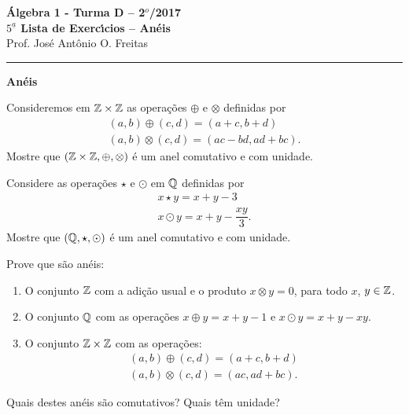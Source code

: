 \documentclass[12pt]{article}
\begin{document}


\begin{center}
 {\Large\bf {\'A}lgebra 1 - Turma D -- 2$^{o}$/2017} \\
 \vspace{9pt} {\large\bf $5^{\underline{a}}$ Lista de Exerc{\'\i}cios -- An\'eis}\\
 \vspace{9pt} Prof. Jos{\'e} Ant{\^o}nio O. Freitas
\end{center}
\hrule


\begin{center}
\Large{\bf An{\'e}is}
\end{center}

\vspace{.6cm}

\questao Consideremos em $\mathbb{Z} \times \mathbb{Z}$ as opera\c{c}\~oes $\oplus$ e $\otimes$ definidas por
\begin{align*}
	(a, b) \oplus (c, d) = (a + c, b + d)\\
	(a ,b) \otimes (c, d) = (ac - bd, ad + bc).
\end{align*}
Mostre que $(\mathbb{Z} \times \mathbb{Z}, \oplus, \otimes)$ \'e um anel comutativo e com unidade.

\vesp

\questao Considere as opera\c{c}\~oes $\star$ e $\odot$ em $\mathbb{Q}$ definidas por
\begin{align*}
	x \star y = x + y - 3\\
	x \odot y = x + y - \dfrac{xy}{3}.
\end{align*}
Mostre que $(\mathbb{Q}, \star, \odot)$ \'e um anel comutativo e com unidade.

\vesp

\questao Prove que s\~ao an\'eis:
\begin{enumerate}[label={\alph*})]
	\item O conjunto $\mathbb{Z}$ com a adi\c{c}\~ao usual e o produto $x \otimes y = 0$, para todo $x$, $y \in \mathbb{Z}$.
	\item O conjunto $\mathbb{Q}$ com as opera\c{c}\~oes $x \oplus y = x + y - 1$ e $x \odot y = x + y - xy$.
	\item O conjunto $\mathbb{Z} \times \mathbb{Z}$ com as opera\c{c}\~oes:
	\begin{align*}
		(a, b) \oplus (c, d) = (a + c, b + d)\\
		(a ,b) \otimes (c, d) = (ac, ad + bc).
	\end{align*}
\end{enumerate}
Quais destes an\'eis s\~ao comutativos? Quais t\^em unidade?
\end{document}
